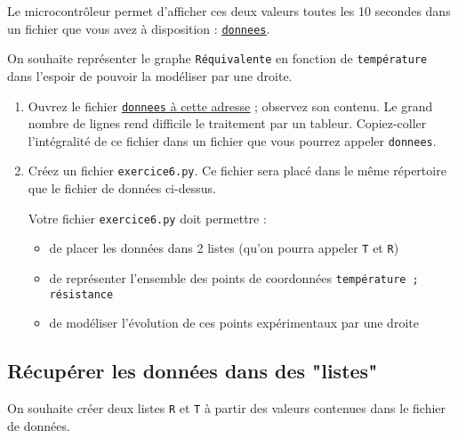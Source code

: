 \documentclass[11pt]{article}
\begin{document}
\medskip

Le microcontrôleur permet d'afficher ces deux valeurs toutes les 10 secondes dans un fichier que vous avez à disposition : \href{https://github.com/formationPythonPC-Juin/enonce-donnees/blob/master/donnees}{\underline{\texttt{donnees}}}.

\medskip

On souhaite représenter le graphe \texttt{Réquivalente} en fonction de \texttt{température} dans l'espoir de pouvoir la modéliser par une droite. 


\medskip


\begin{enumerate}
 \item Ouvrez le fichier  \href{https://github.com/formationPythonPC-Juin/enonce-donnees/blob/master/donnees}{\underline{\texttt{donnees} à cette adresse}} ; observez son contenu. Le grand nombre de lignes rend difficile le traitement par un tableur. Copiez-coller l'intégralité de ce fichier dans un fichier que vous pourrez appeler \texttt{donnees}.
 \item Créez un fichier \texttt{exercice6.py}. Ce fichier sera placé dans le même répertoire que le fichier de données ci-dessus. 
 
 \smallskip
 Votre fichier \texttt{exercice6.py} doit permettre :
 
 
 \begin{itemize}
  \item de placer les données dans 2 listes (qu'on pourra appeler \texttt{T} et \texttt{R})
  \item de représenter l'ensemble des points de coordonnées \texttt{température ; résistance}
  \item de modéliser l'évolution de ces points expérimentaux par une droite
 \end{itemize}

\end{enumerate}



\subsection{Récupérer les données dans des "listes"}


On souhaite créer deux listes \texttt{R} et \texttt{T} à partir des valeurs contenues dans le fichier de données.

\smallskip
\end{document}
